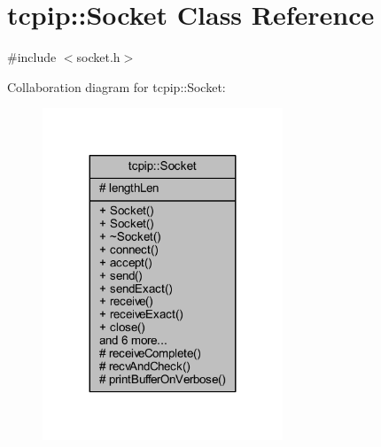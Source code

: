 \hypertarget{classtcpip_1_1_socket}{}\section{tcpip\+:\+:Socket Class Reference}
\label{classtcpip_1_1_socket}


{\ttfamily \#include $<$socket.\+h$>$}



Collaboration diagram for tcpip\+:\+:Socket\+:
\nopagebreak
\begin{figure}[H]
\begin{center}
\leavevmode
\includegraphics[width=203pt]{classtcpip_1_1_socket__coll__graph}
\end{center}
\end{figure}
